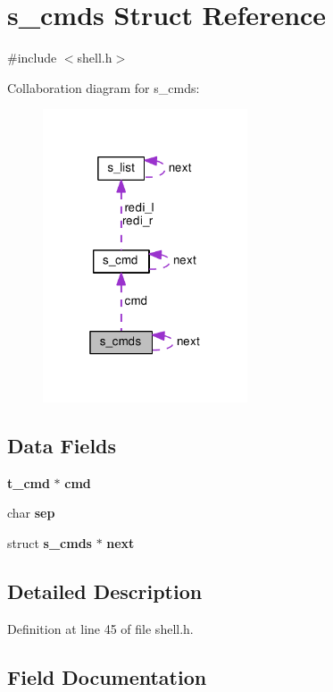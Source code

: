 \section{s\-\_\-cmds Struct Reference}
\label{structs__cmds}


{\ttfamily \#include $<$shell.\-h$>$}



Collaboration diagram for s\-\_\-cmds\-:\nopagebreak
\begin{figure}[H]
\begin{center}
\leavevmode
\includegraphics[width=172pt]{structs__cmds__coll__graph}
\end{center}
\end{figure}
\subsection*{Data Fields}
\begin{DoxyCompactItemize}
\item 
{\bf t\-\_\-cmd} $\ast$ {\bf cmd}
\item 
char {\bf sep}
\item 
struct {\bf s\-\_\-cmds} $\ast$ {\bf next}
\end{DoxyCompactItemize}


\subsection{Detailed Description}


Definition at line 45 of file shell.\-h.



\subsection{Field Documentation}

